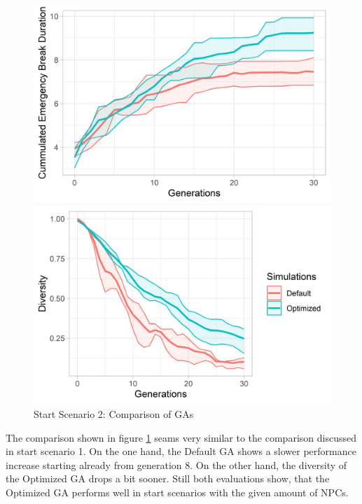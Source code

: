 \begin{figure}[ht] 
	\label{fig:evaluation:sim_2_ga_comparison}
	\begin{minipage}[b]{0.5\linewidth}
		\centering
		\includegraphics[width=1\linewidth]{simulations/evaluation/plots/sim_2_ga_generations} 
	\end{minipage}%
	\begin{minipage}[b]{0.5\linewidth}
		\centering
		\includegraphics[width=1\linewidth]{simulations/evaluation/plots/sim_2_ga_diversity} 
	\end{minipage} 
	\caption{Start Scenario 2: Comparison of GAs}
\end{figure}

The comparison shown in figure \ref{fig:evaluation:sim_2_ga_comparison} seams very similar to the comparison discussed in start scenario 1. On the one hand, the Default GA shows a slower performance increase starting already from generation 8. On the other hand, the diversity of the Optimized GA drops a bit sooner. Still both evaluations show, that the Optimized GA performs well in start scenarios with the given amount of NPCs.

